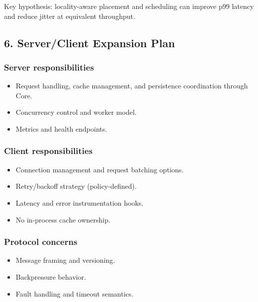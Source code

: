 \documentclass[
  english,
  letterpaper,
  DIV=11,
  numbers=noendperiod]{scrartcl}
\providecommand{\tightlist}{%
  \setlength{\itemsep}{0pt}\setlength{\parskip}{0pt}}
\begin{document}
Key hypothesis: locality-aware placement and scheduling can improve p99
latency and reduce jitter at equivalent throughput.

\subsection{6. Server/Client Expansion
Plan}\label{serverclient-expansion-plan}

\subsubsection{Server responsibilities}\label{server-responsibilities}

\begin{itemize}
\tightlist
\item
  Request handling, cache management, and persistence coordination
  through Core.
\item
  Concurrency control and worker model.
\item
  Metrics and health endpoints.
\end{itemize}

\subsubsection{Client responsibilities}\label{client-responsibilities}

\begin{itemize}
\tightlist
\item
  Connection management and request batching options.
\item
  Retry/backoff strategy (policy-defined).
\item
  Latency and error instrumentation hooks.
\item
  No in-process cache ownership.
\end{itemize}

\subsubsection{Protocol concerns}\label{protocol-concerns}

\begin{itemize}
\tightlist
\item
  Message framing and versioning.
\item
  Backpressure behavior.
\item
  Fault handling and timeout semantics.
\end{itemize}
\end{document}
